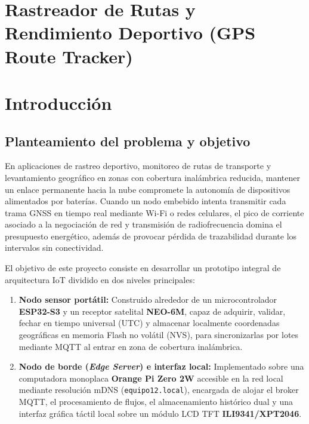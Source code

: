 \documentclass[12pt, letterpaper]{article}
\begin{document}




\normalsize

\section*{\centering \fontsize{17}{17}\sffamily\selectfont Rastreador de Rutas y Rendimiento Deportivo (GPS Route Tracker)}

\vspace*{1cm}
\section*{\centering \fontsize{16}{17}\sffamily\selectfont Introducción}

\subsection*{Planteamiento del problema y objetivo}

En aplicaciones de rastreo deportivo, monitoreo de rutas de transporte y levantamiento geográfico en zonas con cobertura inalámbrica reducida, mantener un enlace permanente hacia la nube compromete la autonomía de dispositivos alimentados por baterías. Cuando un nodo embebido intenta transmitir cada trama GNSS en tiempo real mediante Wi-Fi o redes celulares, el pico de corriente asociado a la negociación de red y transmisión de radiofrecuencia domina el presupuesto energético, además de provocar pérdida de trazabilidad durante los intervalos sin conectividad.

El objetivo de este proyecto consiste en desarrollar un prototipo integral de arquitectura IoT dividido en dos niveles principales:

\begin{enumerate}
    \item \textbf{Nodo sensor portátil:} Construido alrededor de un microcontrolador \textbf{ESP32-S3} y un receptor satelital \textbf{NEO-6M}, capaz de adquirir, validar, fechar en tiempo universal (UTC) y almacenar localmente coordenadas geográficas en memoria Flash no volátil (NVS), para sincronizarlas por lotes mediante MQTT al entrar en zona de cobertura inalámbrica.
    \item \textbf{Nodo de borde (\textit{Edge Server}) e interfaz local:} Implementado sobre una computadora monoplaca \textbf{Orange Pi Zero 2W} accesible en la red local mediante resolución mDNS (\texttt{equipo12.local}), encargada de alojar el broker MQTT, el procesamiento de flujos, el almacenamiento histórico dual y una interfaz gráfica táctil local sobre un módulo LCD TFT \textbf{ILI9341/XPT2046}.
\end{enumerate}
\end{document}
